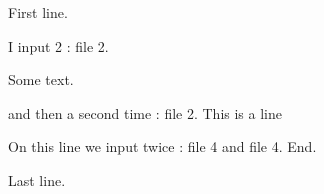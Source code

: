 \documentclass[a4paper,oneside,11pt]{article}
\begin{document}
First line.


I input 2 : file 2.

Some text.

and then a second time : file 2.
This is a line

On this line we input twice : file 4 and file 4. End.  %

Last line.
\end{document}
